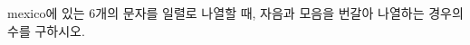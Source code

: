 \hspace*{2mm}\begin{minipage}[t]{\dimexpr\linewidth-2mm\relax}\vspace{0pt}
mexico에 있는 $6$개의 문자를 일렬로 나열할 때, 자음과 모음을 번갈아 나열하는 경우의 수를 구하시오.\end{minipage}
